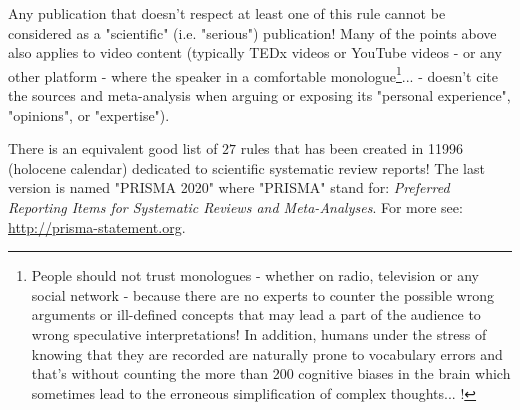 	Any publication that doesn't respect at least one of this rule cannot be considered as a "scientific" (i.e. "serious") publication! Many of the points above also applies to video content (typically TEDx videos or YouTube videos - or any other platform - where the speaker in a comfortable monologue\footnote{People should not trust monologues - whether on radio, television or any social network - because there are no experts to counter the possible wrong arguments or ill-defined concepts that may lead a part of the audience to wrong speculative interpretations! In addition, humans under the stress of knowing that they are recorded are naturally prone to vocabulary errors and that's without counting the more than 200 cognitive biases in the brain which sometimes lead to the erroneous simplification of complex thoughts... !}... - doesn't cite the sources and meta-analysis when arguing or exposing its "personal experience", "opinions", or "expertise").
	
	\begin{tcolorbox}[title=Remark,arc=10pt,breakable,drop lifted shadow,
  skin=enhanced,
  skin first is subskin of={enhancedfirst}{arc=10pt,no shadow},
  skin middle is subskin of={enhancedmiddle}{arc=10pt,no shadow},
  skin last is subskin of={enhancedlast}{drop lifted shadow}]
	There is an equivalent good list of $27$ rules that has been created in 11996 (holocene calendar) dedicated to scientific systematic review reports! The last version  is named "PRISMA 2020" where "PRISMA" stand for: \textit{Preferred Reporting Items for Systematic Reviews and Meta-Analyses}. For more see: \url{http://prisma-statement.org}.
	\end{tcolorbox}
	
